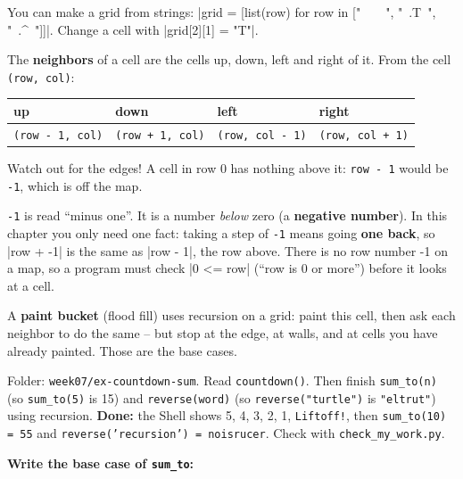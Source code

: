 You can make a grid from strings: \py|grid = [list(row) for row in ["~~~~", "~.T~", "~.^~"]]|. Change a cell with \py|grid[2][1] = "T"|.

The \textbf{neighbors} of a cell are the cells up, down, left and right of it. From the cell \texttt{(row, col)}:
\begin{center}\small
\begin{tabular}{@{}llll@{}}
\toprule
up & down & left & right\\ \midrule
\texttt{(row - 1, col)} & \texttt{(row + 1, col)} & \texttt{(row, col - 1)} & \texttt{(row, col + 1)}\\
\bottomrule
\end{tabular}
\end{center}
Watch out for the edges! A cell in row 0 has nothing above it: \texttt{row - 1} would be \texttt{-1}, which is off the map.

\begin{tip}
\texttt{-1} is read \enquote{minus one}. It is a number \emph{below} zero (a \textbf{negative number}). In this chapter you only need one fact: taking a step of \texttt{-1} means going \textbf{one back}, so \py|row + -1| is the same as \py|row - 1|, the row above. There is no row number -1 on a map, so a program must check \py|0 <= row| (\enquote{row is 0 or more}) before it looks at a cell.
\end{tip}

A \textbf{paint bucket} (flood fill) uses recursion on a grid: paint this cell, then ask each neighbor to do the same -- but stop at the edge, at walls, and at cells you have already painted. Those are the base cases.

\begin{exercise}
Folder: \texttt{week07/ex-countdown-sum}. Read \texttt{countdown()}. Then finish \texttt{sum\_to(n)} (so \texttt{sum\_to(5)} is 15) and \texttt{reverse(word)} (so \texttt{reverse("turtle")} is \texttt{"eltrut"}) using recursion. \textbf{Done:} the Shell shows 5, 4, 3, 2, 1, \texttt{Liftoff!}, then \texttt{sum\_to(10) = 55} and \texttt{reverse('recursion') = noisrucer}. Check with \texttt{check\_my\_work.py}.

\textbf{Write the base case of \texttt{sum\_to}:} 
\end{exercise}

